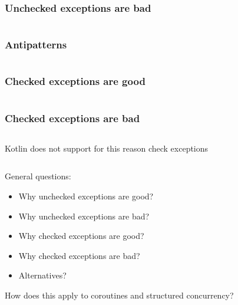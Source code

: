 \documentclass[10pt]{beamer}
\begin{document}
{\begin{frame}[fragile]
\frametitle{Unchecked exceptions are bad}
\begin{lstlisting}[language=Kotlin, basicstyle=\ttfamily]
\end{lstlisting}
\end{frame}

\begin{frame}[fragile]
\frametitle{Antipatterns}
\begin{lstlisting}[language=Kotlin, basicstyle=\ttfamily]
\end{lstlisting}
\end{frame}

\begin{frame}[fragile]
\frametitle{Checked exceptions are good}
\begin{lstlisting}[language=Kotlin, basicstyle=\ttfamily]
\end{lstlisting}
\end{frame}

\begin{frame}[fragile]
\frametitle{Checked exceptions are bad}
\begin{lstlisting}[language=Kotlin, basicstyle=\ttfamily]
\end{lstlisting}
\end{frame}

\begin{frame}[fragile]
Kotlin does not support for this reason check exceptions 
\begin{lstlisting}[language=Kotlin, basicstyle=\ttfamily]
\end{lstlisting}
\end{frame}
}




\begin{frame}[fragile]
General questions:
\begin{itemize}
\item Why unchecked exceptions are good?
\item Why unchecked exceptions are bad?
\item Why checked exceptions are good?
\item Why checked exceptions are bad?
\item Alternatives?
\end{itemize}
How does this apply to coroutines and structured concurrency?
\end{frame}
\end{document}
